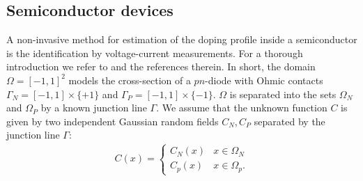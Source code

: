 \documentclass{amsart}
\theoremstyle{definition}
\begin{document}

\FloatBarrier
\subsection{Semiconductor devices}


A non-invasive method for estimation of the doping profile inside a semiconductor is the identification by voltage-current measurements. For a thorough introduction we refer to \cite{Taghizadeh2025Bayesian} and the references therein.
In short, the domain $\Omega = [-1, 1]^2$ models the cross-section of a $pn$-diode with Ohmic contacts $\Gamma_N = [-1, 1] \times\{ +1\}$ and $\Gamma_P = [-1, 1] \times\{ -1\}$. $\Omega$ is separated into the sets $\Omega_N$ and $\Omega_P$ by a known junction line $\Gamma$.
We assume that the unknown function $C$ is given by two independent Gaussian random fields $C_N, C_P$ separated by the junction line $\Gamma$:
\begin{eqnarray}\label{eq: piecewise constant C}
    C(x) = \begin{cases}
        C_N(x) & x \in \Omega_N \\
        C_p(x) & x \in \Omega_p.
    \end{cases}
\end{eqnarray}
\end{document}
